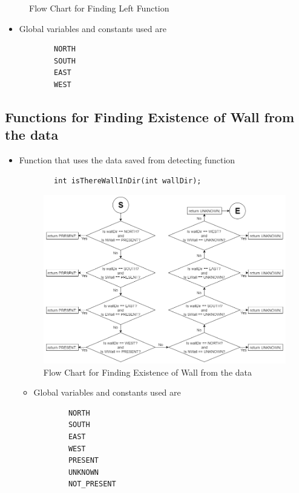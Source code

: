 \documentclass[11pt]{article}
\begin{document}
\begin{itemize}
\begin{figure}[htp]
\caption{Flow Chart for Finding Left Function}
\label{}
\end{figure}
	\begin{itemize}
	\item Global variables and constants used are
	\begin{verbatim}
		NORTH
		SOUTH
		EAST
		WEST
	\end{verbatim}
	\end{itemize}
\end{itemize}
\newpage


\subsection{Functions for Finding Existence of Wall from the data}
\begin{itemize}
\item Function that uses the data saved from detecting function
	\begin{verbatim}
		int isThereWallInDir(int wallDir);
	\end{verbatim}
\begin{figure}[htp]
\centering
\includegraphics[scale=0.580]{images/Software_Flowchart/isThereWallInDir.png}
\caption{Flow Chart for Finding Existence of Wall from the data}
\label{}
\end{figure}
	\begin{itemize}
	\item Global variables and constants used are
	\begin{verbatim}
		NORTH
		SOUTH
		EAST
		WEST
		PRESENT
		UNKNOWN
		NOT_PRESENT
	\end{verbatim}
	\end{itemize}
\end{itemize}
\newpage
\end{document}
